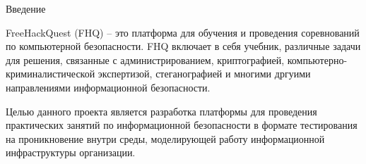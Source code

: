 \begin{center}
Введение
\end{center}

\vspace{\baselineskip}

FreeHackQuest (FHQ) -- это платформа для обучения и проведения соревнований по компьютерной безопасности. FHQ включает в себя учебник, различные задачи для решения, связанные с администрированием, криптографией, компьютерно-криминалистической экспертизой, стеганографией и многими дргуими направлениями информационной безопасности. \par

Целью данного проекта является разработка платформы для проведения практических занятий по информационной безопасности в формате тестирования на проникновение внутри среды, моделирующей работу информационной инфраструктуры организации.\par 

\clearpage
